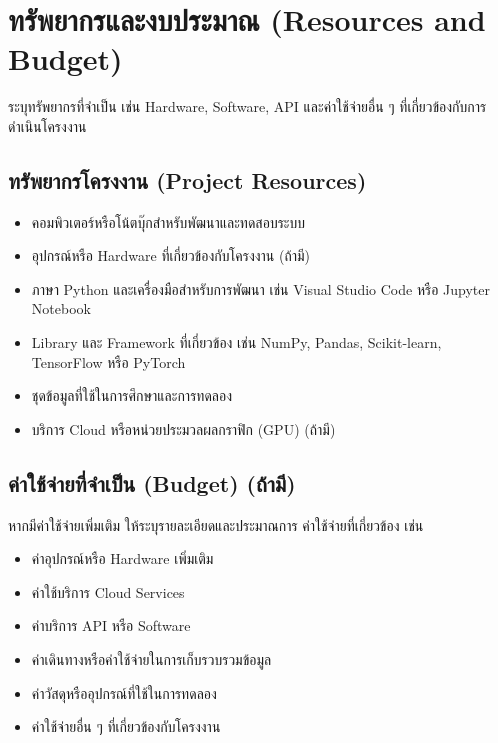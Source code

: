 \documentclass[20pt,a4paper]{article}
\begin{document}
\section{ทรัพยากรและงบประมาณ
(Resources and Budget)}

ระบุทรัพยากรที่จำเป็น เช่น Hardware, Software, API
และค่าใช้จ่ายอื่น ๆ ที่เกี่ยวข้องกับการดำเนินโครงงาน

\subsection{ทรัพยากรโครงงาน (Project Resources)}

\begin{itemize}

    \item คอมพิวเตอร์หรือโน้ตบุ๊กสำหรับพัฒนาและทดสอบระบบ

    \item อุปกรณ์หรือ Hardware ที่เกี่ยวข้องกับโครงงาน (ถ้ามี)

    \item ภาษา Python และเครื่องมือสำหรับการพัฒนา
    เช่น Visual Studio Code หรือ Jupyter Notebook

    \item Library และ Framework ที่เกี่ยวข้อง
    เช่น NumPy, Pandas, Scikit-learn, TensorFlow หรือ PyTorch

    \item ชุดข้อมูลที่ใช้ในการศึกษาและการทดลอง

    \item บริการ Cloud หรือหน่วยประมวลผลกราฟิก (GPU) (ถ้ามี)

\end{itemize}

\subsection{ค่าใช้จ่ายที่จำเป็น (Budget) (ถ้ามี)}

หากมีค่าใช้จ่ายเพิ่มเติม ให้ระบุรายละเอียดและประมาณการ
ค่าใช้จ่ายที่เกี่ยวข้อง เช่น

\begin{itemize}

    \item ค่าอุปกรณ์หรือ Hardware เพิ่มเติม

    \item ค่าใช้บริการ Cloud Services

    \item ค่าบริการ API หรือ Software

    \item ค่าเดินทางหรือค่าใช้จ่ายในการเก็บรวบรวมข้อมูล

    \item ค่าวัสดุหรืออุปกรณ์ที่ใช้ในการทดลอง

    \item ค่าใช้จ่ายอื่น ๆ ที่เกี่ยวข้องกับโครงงาน

\end{itemize}
\end{document}
